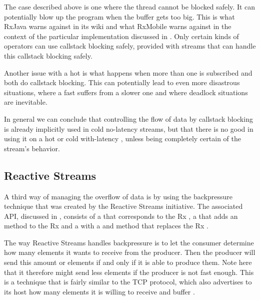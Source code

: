 The case described above is one where the thread cannot be blocked safely. It can potentially blow up the program when the buffer gets too big. This is what RxJava warns against in its wiki \cite{RxJava-Wiki-Callstack-Blocking} and what RxMobile warns against in the context of the particular  implementation discussed in  \cite{RxMobile}. Only certain kinds of operators can use callstack blocking safely, provided with streams that can handle this callstack blocking safely.

Another issue with a hot \obs is what happens when more than one \obv is subscribed and both do callstack blocking. This can potentially lead to even more disastrous situations, where a fast \obv suffers from a slower one and where deadlock situations are inevitable.

In general we can conclude that controlling the flow of data by callstack blocking is already implicitly used in cold no-latency streams, but that there is no good in using it on a hot or cold with-latency \obs, unless being completely certain of the stream's behavior.

\subsection{Reactive Streams}
\label{subsec:handling-overproduction-with-reactive-streams}
A third way of managing the overflow of data is by using the backpressure technique that was created by the Reactive Streams initiative. The associated API, discussed in , consists of a  that corresponds to the Rx \obs, a  that adds an  method to the Rx \obv and a  with a  and  method that replaces the Rx \subs.

The way Reactive Streams handles backpressure is to let the consumer determine how many elements it wants to receive from the producer. Then the producer will send this amount or elements if and only if it is able to produce them. Note here that it therefore might send less elements if the producer is not fast enough. This is a technique that is fairly similar to the TCP protocol, which also advertises to its host how many elements it is willing to receive and buffer \cite{tanenbaum2011-Computer-Networks}.

